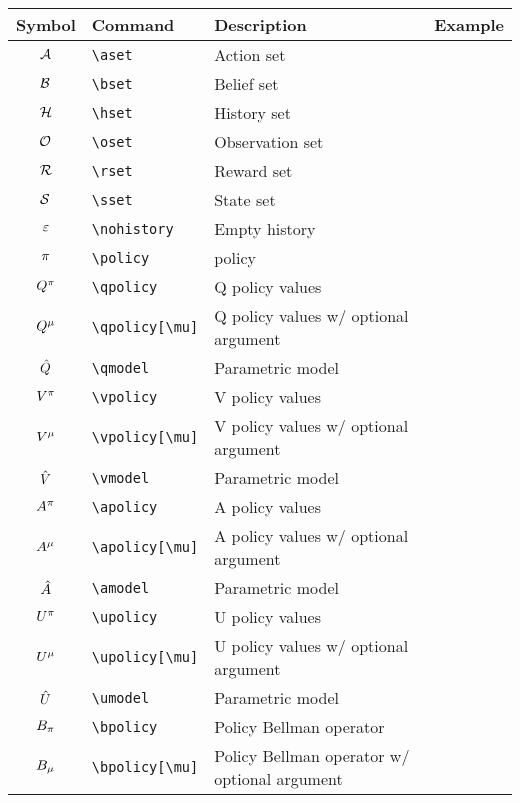 \documentclass{article}
\begin{document}
\begin{tabular}{clll}
  \toprule
  Symbol & Command & Description & Example \\
  \midrule
  $\aset$ & \verb|\aset| & Action set \\
  $\bset$ & \verb|\bset| & Belief set \\
  $\hset$ & \verb|\hset| & History set \\
  $\oset$ & \verb|\oset| & Observation set \\
  $\rset$ & \verb|\rset| & Reward set \\
  $\sset$ & \verb|\sset| & State set \\
  \midrule
  $\nohistory$ & \verb|\nohistory| & Empty history \\
  \midrule
  $\policy$ & \verb|\policy| & policy \\
  \midrule
  $\qpolicy$ & \verb|\qpolicy| & Q policy values \\
  $\qpolicy[\mu]$ & \verb|\qpolicy[\mu]| & Q policy values w/ optional argument \\
  $\qmodel$ & \verb|\qmodel| & Parametric model \\
  \midrule
  $\vpolicy$ & \verb|\vpolicy| & V policy values \\
  $\vpolicy[\mu]$ & \verb|\vpolicy[\mu]| & V policy values w/ optional argument \\
  $\vmodel$ & \verb|\vmodel| & Parametric model \\
  \midrule
  $\apolicy$ & \verb|\apolicy| & A policy values \\
  $\apolicy[\mu]$ & \verb|\apolicy[\mu]| & A policy values w/ optional argument \\
  $\amodel$ & \verb|\amodel| & Parametric model \\
  \midrule
  $\upolicy$ & \verb|\upolicy| & U policy values \\
  $\upolicy[\mu]$ & \verb|\upolicy[\mu]| & U policy values w/ optional argument \\
  $\umodel$ & \verb|\umodel| & Parametric model \\
  \midrule
  $\bpolicy$ & \verb|\bpolicy| & Policy Bellman operator \\
  $\bpolicy[\mu]$ & \verb|\bpolicy[\mu]| & Policy Bellman operator w/ optional argument \\
  \bottomrule
\end{tabular}
\end{document}
